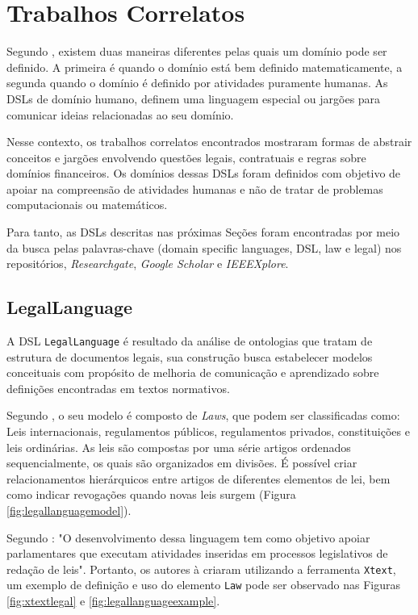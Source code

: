\section{Trabalhos Correlatos}
\label{subsection:trabalhoscorrelatos}
 Segundo , existem duas maneiras diferentes pelas quais um domínio pode ser definido. A primeira é quando o domínio está bem definido matematicamente, a segunda quando o domínio é definido por atividades puramente humanas. As DSLs de domínio humano, definem uma linguagem especial ou jargões para comunicar ideias relacionadas ao seu domínio.  
 
 Nesse contexto, os trabalhos correlatos encontrados mostraram formas de abstrair conceitos e jargões envolvendo questões legais, contratuais e regras sobre domínios financeiros. Os domínios dessas DSLs foram definidos com objetivo de apoiar na compreensão de atividades humanas e não de tratar de problemas computacionais ou matemáticos.
 
 Para tanto, as DSLs descritas nas próximas Seções foram encontradas por meio da busca pelas palavras-chave (domain specific languages, DSL, law e legal)  nos repositórios, \textit{Researchgate}, \textit{Google Scholar} e \textit{IEEEXplore}.
 
 
\subsection{LegalLanguage}
\label{legallanguage}

A DSL \texttt{LegalLanguage} é resultado da análise de ontologias que tratam de estrutura de documentos legais, sua construção busca estabelecer modelos conceituais com propósito de melhoria de comunicação e aprendizado sobre definições encontradas em textos normativos.



Segundo , o seu modelo é composto de \textit{Laws}, que podem ser classificadas como: Leis internacionais, regulamentos públicos, regulamentos privados, constituições e leis ordinárias. As leis são compostas por uma série artigos ordenados sequencialmente, os quais são organizados em divisões. É possível criar relacionamentos hierárquicos entre artigos de diferentes elementos de lei, bem como indicar revogações quando novas leis surgem (Figura \ref{fig:legallanguagemodel}). 

Segundo : "O desenvolvimento dessa linguagem tem como objetivo apoiar parlamentares que executam atividades inseridas em processos legislativos de redação de leis". Portanto, os autores à criaram utilizando a ferramenta \texttt{Xtext}, um exemplo de definição e uso do elemento \texttt{Law} pode ser observado nas Figuras \ref{fig:xtextlegal} e \ref{fig:legallanguageexample}.

